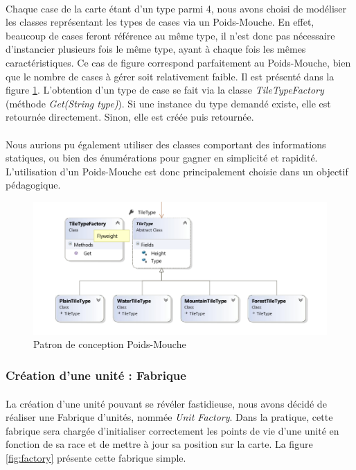 \paragraph{}
Chaque case de la carte étant d'un type parmi 4, nous avons choisi de modéliser les classes représentant les types de cases via un Poids-Mouche.
En effet, beaucoup de cases feront référence au même type, il n'est donc pas nécessaire d'instancier plusieurs fois le même type, ayant à chaque fois les mêmes caractéristiques.
Ce cas de figure correspond parfaitement au Poids-Mouche, bien que le nombre de cases à gérer soit relativement faible. Il est présenté dans la figure \ref{fig:flyweight}.
L'obtention d'un type de case se fait via la classe \emph{TileTypeFactory} (méthode \emph{Get(String type)}). Si une instance du type demandé existe, elle est retournée directement.
Sinon, elle est créée puis retournée.

\paragraph{}
Nous aurions pu également utiliser des classes comportant des informations statiques, ou bien des énumérations pour gagner en simplicité et rapidité.
L'utilisation d'un Poids-Mouche est donc principalement choisie dans un objectif pédagogique.

\begin{figure}
  \centering
  \includegraphics[width=13cm]{schemas/dp_flyweight.png}
  \caption{Patron de conception Poids-Mouche}
  \label{fig:flyweight}
\end{figure}

\subsubsection{Création d'une unité : Fabrique}

\paragraph{}
La création d'une unité pouvant se révéler fastidieuse, nous avons décidé de réaliser une Fabrique d'unités, nommée \emph{Unit Factory}.
Dans la pratique, cette fabrique sera chargée d'initialiser correctement les points de vie d'une unité en fonction de sa race et de mettre à jour sa position sur la carte.
La figure \ref{fig:factory} présente cette fabrique simple.

